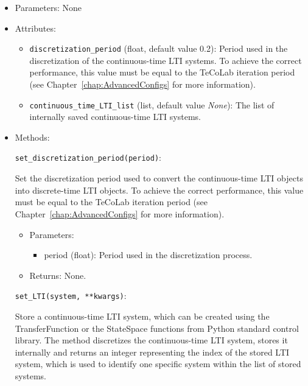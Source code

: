 \documentclass[12pt]{report}
\begin{document}
\begin{itemize}

\item Parameters: None

\item Attributes:

\begin{itemize}
\item \texttt{discretization\_period} (float, default value 0.2): Period used in the discretization of the continuous-time LTI systems. To achieve the correct performance, this value must be equal to the TeCoLab iteration period (see Chapter~\ref{chap:AdvancedConfigs} for more information).

\item \texttt{continuous\_time\_LTI\_list} (list, default value \emph{None}): The list of internally saved continuous-time LTI systems.
\end{itemize}

\item Methods:

\texttt{set\_discretization\_period(period)}:

Set the discretization period used to convert the continuous-time LTI objects into discrete-time LTI objects. To achieve the correct performance, this value must be equal to the TeCoLab iteration period (see Chapter~\ref{chap:AdvancedConfigs} for more information).

\begin{itemize}
\item Parameters:

\begin{itemize}

\item period (float): Period used in the discretization process.

\end{itemize}

\item Returns: None.

\end{itemize}

\texttt{set\_LTI(system, **kwargs)}:

Store a continuous-time LTI system, which can be created using the TransferFunction or the StateSpace functions from Python standard control library. The method discretizes the continuous-time LTI system, stores it internally and returns an integer representing the index of the stored LTI system, which is used to identify one specific system within the list of stored systems.


\end{itemize}
\end{document}
